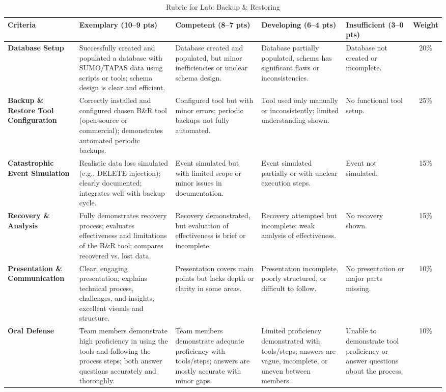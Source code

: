 \documentclass[10pt, landscape]{article}
\begin{document}
\begin{table}
\centering
\caption{Rubric for Lab: Backup \& Restoring}
\label{tab:lab05-rubric}
\begin{tabular}{@{}p{4cm}p{5cm}p{5cm}p{4cm}p{4cm}c@{}}
\toprule
\textbf{Criteria} & \textbf{Exemplary (10--9 pts)} & \textbf{Competent (8--7 pts)} & \textbf{Developing (6--4 pts)} & \textbf{Insufficient (3--0 pts)} & \textbf{Weight} \\ \midrule
\textbf{Database Setup} & Successfully created and populated a database with SUMO/TAPAS data using scripts or tools; schema design is clear and efficient. & Database created and populated, but minor inefficiencies or unclear schema design. & Database partially populated, schema has significant flaws or inconsistencies. & Database not created or incomplete. & 20\% \\ \midrule
\textbf{Backup \& Restore Tool Configuration} & Correctly installed and configured chosen B\&R tool (open-source or commercial); demonstrates automated periodic backups. & Configured tool but with minor errors; periodic backups not fully automated. & Tool used only manually or inconsistently; limited understanding shown. & No functional tool setup. & 25\% \\ \midrule
\textbf{Catastrophic Event Simulation} & Realistic data loss simulated (e.g., DELETE injection); clearly documented; integrates well with backup cycle. & Event simulated but with limited scope or minor issues in documentation. & Event simulated partially or with unclear execution steps. & Event not simulated. & 15\% \\ \midrule
\textbf{Recovery \& Analysis} & Fully demonstrates recovery process; evaluates effectiveness and limitations of the B\&R tool; compares recovered vs. lost data. & Recovery demonstrated, but evaluation of effectiveness is brief or incomplete. & Recovery attempted but incomplete; weak analysis of effectiveness. & No recovery shown. & 15\% \\ \midrule
\textbf{Presentation \& Communication} & Clear, engaging presentation; explains technical process, challenges, and insights; excellent visuals and structure. & Presentation covers main points but lacks depth or clarity in some areas. & Presentation incomplete, poorly structured, or difficult to follow. & No presentation or major parts missing. & 10\% \\ \midrule
\textbf{Oral Defense} & Team members demonstrate high proficiency in using the tools and following the process steps; both answer questions accurately and thoroughly. & Team members demonstrate adequate proficiency with tools/steps; answers are mostly accurate with minor gaps. & Limited proficiency demonstrated with tools/steps; answers are vague, incomplete, or uneven between members. & Unable to demonstrate tool proficiency or answer questions about the process. & 10\% \\ \midrule

\end{tabular}
\end{table}
\end{document}
